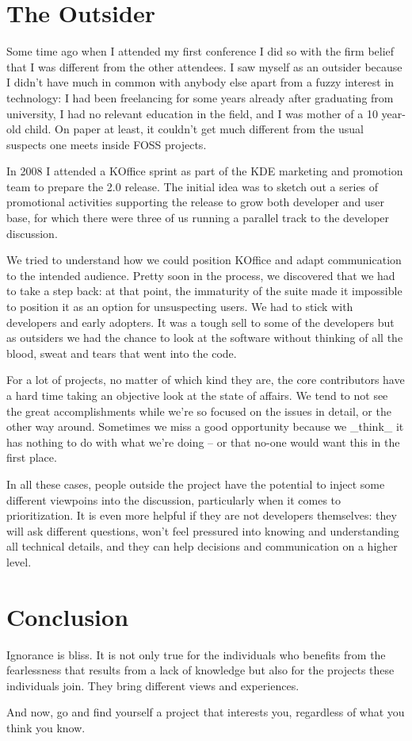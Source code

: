 \section{The Outsider}

Some time ago when I attended my first conference I did so with the firm belief that I was different from the other attendees. I saw myself as an outsider because I didn't have much in common with anybody else apart from a fuzzy interest in technology: I had been freelancing for some years already after graduating from university, I had no relevant education in the field, and I was mother of a 10 year-old child. On paper at least, it couldn't get much different from the usual suspects one meets inside FOSS projects.

In 2008 I attended a KOffice sprint as part of the KDE marketing and promotion team to prepare the 2.0 release. The initial idea was to sketch out a series of promotional activities supporting the release to grow both developer and user base, for which there were three of us running a parallel track to the developer discussion.

We tried to understand how we could position KOffice and adapt communication to the intended audience. Pretty soon in the process, we discovered that we had to take a step back: at that point, the immaturity of the suite made it impossible to position it as an option for unsuspecting users. We had to stick with developers and early adopters. It was a tough sell to some of the developers but as outsiders we had the chance to look at the software without thinking of all the blood, sweat and tears that went into the code.

For a lot of projects, no matter of which kind they are, the core contributors have a hard time taking an objective look at the state of affairs. We tend to not see the great accomplishments while we're so focused on the issues in detail, or the other way around. Sometimes we miss a good opportunity because we _think_ it has nothing to do with what we're doing -- or that no-one would want this in the first place.

In all these cases, people outside the project have the potential to inject some different viewpoins into the discussion, particularly when it comes to prioritization. It is even more helpful if they are not developers themselves: they will ask different questions, won't feel pressured into knowing and understanding all technical details, and they can help decisions and communication on a higher level.

\section{Conclusion}

Ignorance is bliss. It is not only true for the individuals who benefits from the fearlessness that results from a lack of knowledge but also for the projects these individuals join. They bring different views and experiences.

And now, go and find yourself a project that interests you, regardless of what you think you know.
